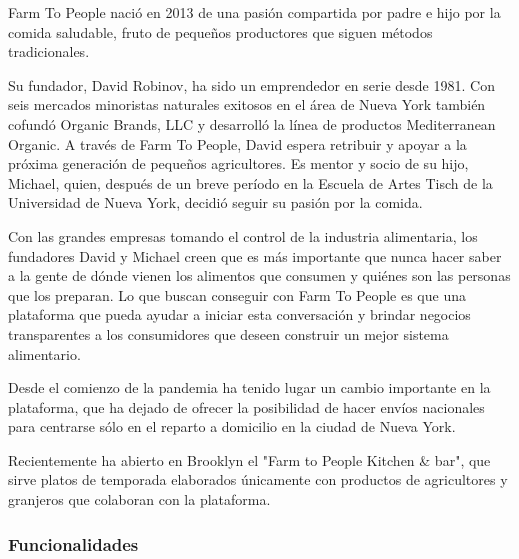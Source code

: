 Farm To People nació en 2013 de una pasión compartida por padre e hijo por la comida saludable, fruto de pequeños productores que siguen métodos tradicionales.

Su fundador, David Robinov, ha sido un emprendedor en serie desde 1981. Con seis mercados minoristas naturales exitosos en el área de Nueva York también cofundó Organic Brands, LLC y desarrolló la línea de productos Mediterranean Organic. A través de Farm To People, David espera retribuir y apoyar a la próxima generación de pequeños agricultores. Es mentor y socio de su hijo, Michael, quien, después de un breve período en la Escuela de Artes Tisch de la Universidad de Nueva York, decidió seguir su pasión por la comida.

Con las grandes empresas tomando el control de la industria alimentaria, los fundadores David y Michael creen que es más importante que nunca hacer saber a la gente de dónde vienen los alimentos que consumen y quiénes son las personas que los preparan. Lo que buscan conseguir con Farm To People es que una plataforma que pueda ayudar a iniciar esta conversación y brindar negocios transparentes a los consumidores que deseen construir un mejor sistema alimentario.

Desde el comienzo de la pandemia ha tenido lugar un cambio importante en la plataforma, que ha dejado de ofrecer la posibilidad de hacer envíos nacionales para centrarse sólo en el reparto a domicilio en la ciudad de Nueva York.

Recientemente ha abierto en Brooklyn el "Farm to People Kitchen \& bar", que sirve platos de temporada elaborados únicamente con productos de agricultores y granjeros que colaboran con la plataforma.

\subsubsection{Funcionalidades}

